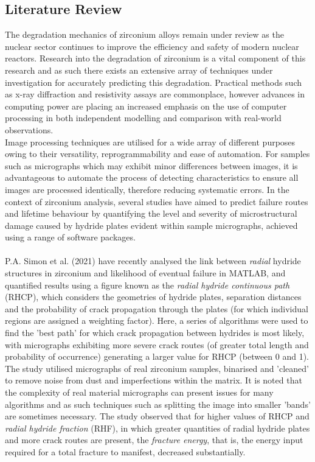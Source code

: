 \documentclass{article}
\begin{document}
	\subsection{Literature Review}
	The degradation mechanics of zirconium alloys remain under review as the nuclear sector continues to improve the efficiency and safety of modern nuclear reactors. Research into the degradation of zirconium is a vital component of this research and as such there exists an extensive array of techniques under investigation for accurately predicting this degradation. Practical methods such as x-ray diffraction and resistivity assays are commonplace, however advances in computing power are placing an increased emphasis on the use of computer processing in both independent modelling and comparison with real-world observations.
	\\
	Image processing techniques are utilised for a wide array of different purposes owing to their versatility, reprogrammability and ease of automation. For samples such as micrographs which may exhibit minor differences between images, it is advantageous to automate the process of detecting characteristics to ensure all images are processed identically, therefore reducing systematic errors. In the context of zirconium analysis, several studies have aimed to predict failure routes and lifetime behaviour by quantifying the level and severity of microstructural damage caused by hydride plates evident within sample micrographs, achieved using a range of software packages.
	\\
	\\
	P.A. Simon et al. (2021) \cite{Simon2021} have recently analysed the link between \textit{radial} hydride structures in zirconium and likelihood of eventual failure in MATLAB, and quantified results using a figure known as the \textit{radial hydride continuous path} (RHCP), which considers the geometries of hydride plates, separation distances and the probability of crack propagation through the plates (for which individual regions are assigned a weighting factor). Here, a series of algorithms were used to find the 'best path' for which crack propagation between hydrides is most likely, with micrographs exhibiting more severe crack routes (of greater total length and probability of occurrence) generating a larger value for RHCP (between 0 and 1). The study utilised micrographs of real zirconium samples, binarised and 'cleaned' to remove noise from dust and imperfections within the matrix. It is noted that the complexity of real material micrographs can present issues for many algorithms and as such techniques such as splitting the image into smaller 'bands' are sometimes necessary. The study observed that for higher values of RHCP and \textit{radial hydride fraction} (RHF), in which greater quantities of radial hydride plates and more crack routes are present, the \textit{fracture energy}, that is, the energy input required for a total fracture to manifest, decreased substantially.
\end{document}
